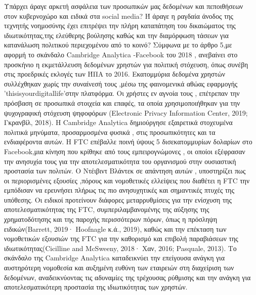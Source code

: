 \documentclass{report}
\begin{document}
Υπάρχει άραγε αρκετή ασφάλεια των προσωπικών μας δεδομένων και πεποιθήσεων στον κυβερνοχώρο και ειδικά στα social media? Ή άραγε η ραγδαία άνοδος της τεχνητής νοημοσύνης έχει επιτρέψει την πλήρη καταπάτηση του δικαιώματος της ιδιωτικότητας,της ελεύθερης βούλησης καθώς και την διαμόρφωση τάσεων για κατανάλωση πολιτικού περιεχομένου από το κοινό?
\newline Σύμφωνα με το άρθρο 5,με αφορμή το σκάνδαλο Cambridge Analytica -Facebook του 2018 , ανεβαίνει στο προσκήνιο η εκμετάλλευση δεδομένων χρηστών για πολιτική στόχευση, όπως συνέβη στις προεδρικές εκλογές των ΉΠΑ το 2016. Εκατομμύρια δεδομένα χρηστών συλλέχθηκαν χωρίς την συναίνεσή τους ,μέσω της φαινομενικά αθώας εφαρμογής 'thisisyourdigitallife'στην πλατφόρμα. Οι χρήστες εν αγνοία τους , επέτρεπαν την πρόσβαση σε προσωπικά στοιχεία και επαφές, τα οποία χρησιμοποιήθηκαν για την ψυχογραφική στόχευση ψηφοφόρων (Electronic Privacy
Information Center, 2019; Γκρανβίλ, 2018). Η Cambridge Analytica δημιούργησε εξαιρετικά στοχευμένα πολιτικά μηνύματα, προσαρμοσμένα φυσικά , στις προσωπικότητες και τα ενδιαφέροντα αυτών. Η FTC επέβαλλε ποινή ύψους 5 δισεκατομμυρίων δολαρίων στο Facebook,μια κίνηση που
κρίθηκε από τους εμπειρογνώμονες , οι οποίοι εξέφρασαν την ανησυχία τους για την αποτελεσματικότητα του οργανισμού στην ουσιαστική προστασία των πολιτών. Ο Ντέιβιντ Βλάντεκ σε απάντηση αυτών , υποστηρίζει πως οι περιορισμένες εξουσίες ,πόρους και νομοθετικές ελλείψεις που διαθέτει η FTC την εμπόδισαν να ερευνήσει πλήρως τις πιο ανησυχητικές και σημαντικές πτυχές της υπόθεσης. Οι ειδικοί προτείνουν διάφορες μεταρρυθμίσεις για την ενίσχυση της αποτελεσματικότητας της FTC, συμπεριλαμβανομένης της αύξησης της χρηματοδότησης και της παροχής περισσότερων πόρων, όπως η πρόσληψη ειδικών(Barrett, 2019· Hoofnagle κ.ά., 2019), καθώς και την επέκταση των νομοθετικών εξουσιών της FTC για την καθορισμό και επιβολή παραβιάσεων της
ιδιωτικότητας(Cicilline and McSweeny, 2018· Χαν, 2016; Pasquale, 2013). Το σκάνδαλο της Cambridge Analytica καταδεικνύει την επείγουσα ανάγκη για αυστηρότερη νομοθεσία και αυξημένη ευθύνη των εταιρειών στη διαχείριση των δεδομένων, αναδεικνύοντας τις αδυναμίες της τρέχουσας ρύθμισης και την ανάγκη για αποτελεσματικότερη προστασία της ιδιωτικότητας των χρηστών.
\end{document}
